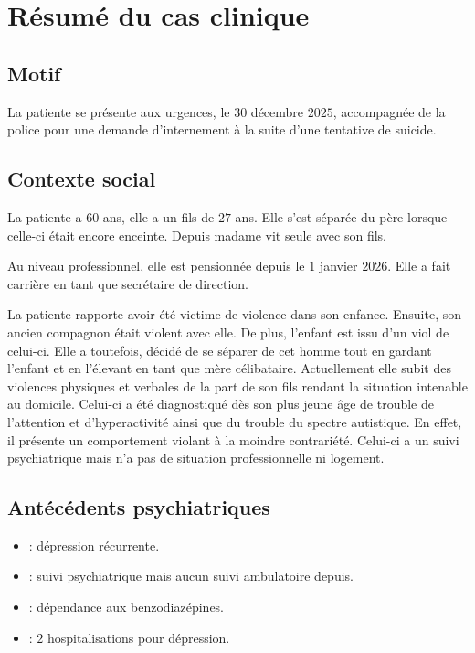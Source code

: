 \section{Résumé du cas clinique}

\subsection{Motif}
La patiente se présente aux urgences, le $30$ décembre $2025$, accompagnée de la police pour une demande d’internement à la suite d'une tentative de suicide.

\subsection{Contexte social}
La patiente a $60$ ans, elle a un fils de $27$ ans. Elle s’est séparée du père lorsque celle-ci était encore enceinte. Depuis madame vit seule avec son fils.

Au niveau professionnel, elle est pensionnée depuis le $1$ janvier $2026$. Elle a fait carrière en tant que secrétaire de direction.

La patiente rapporte avoir été victime de violence dans son enfance. 
Ensuite, son ancien compagnon était violent avec elle. De plus, l’enfant est issu d’un viol de celui-ci. Elle a toutefois, décidé de se séparer de cet homme tout en gardant l’enfant et en l’élevant en tant que mère célibataire. Actuellement elle subit des violences physiques et verbales de la part de son fils rendant la situation intenable au domicile. Celui-ci a été diagnostiqué dès son plus jeune âge de trouble de l’attention et d’hyperactivité ainsi que du trouble du spectre autistique. En effet, il présente un comportement violant à la moindre contrariété. Celui-ci a un suivi psychiatrique mais n’a pas de situation professionnelle ni logement.

\subsection{Antécédents psychiatriques}
\begin{itemize}[label=\textbullet]
    \item {} : dépression récurrente.
    \item  {} : suivi psychiatrique mais aucun suivi ambulatoire depuis.
    \item {} : dépendance aux benzodiazépines.
    \item {} : $2$ hospitalisations pour dépression.
\end{itemize}

